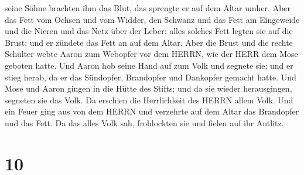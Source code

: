 seine Söhne brachten ihm das Blut, das sprengte er auf dem Altar umher.
 Aber das Fett vom Ochsen und vom Widder, den Schwanz und
das Fett am Eingeweide und die Nieren und das Netz über der Leber:
 alles solches Fett legten sie auf die Brust; und er
zündete das Fett an auf dem Altar.  Aber die Brust und die
rechte Schulter webte Aaron zum Webopfer vor dem HERRN, wie der HERR dem
Mose geboten hatte.  Und Aaron hob seine Hand auf zum Volk
und segnete sie; und er stieg herab, da er das Sündopfer, Brandopfer und
Dankopfer gemacht hatte.  Und Mose und Aaron gingen in die
Hütte des Stifts; und da sie wieder herausgingen, segneten sie das Volk.
Da erschien die Herrlichkeit des HERRN allem Volk.  Und ein
Feuer ging aus von dem HERRN und verzehrte auf dem Altar das Brandopfer
und das Fett. Da das alles Volk sah, frohlockten sie und fielen auf ihr
Antlitz.

\hypertarget{section-9}{%
\section{10}\label{section-9}}

